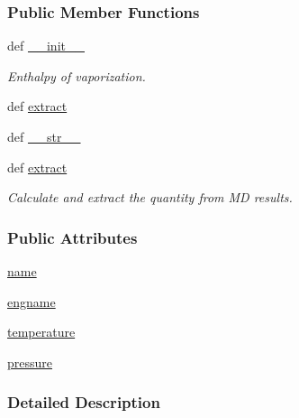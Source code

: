 \subsubsection*{Public Member Functions}
\begin{DoxyCompactItemize}
\item 
def \hyperlink{classforcebalance_1_1quantity_1_1Quantity__H__vap_ac34dd0a9254d752f9652855de93fa0e5}{\-\_\-\-\_\-init\-\_\-\-\_\-}
\begin{DoxyCompactList}\small\item\em Enthalpy of vaporization. \end{DoxyCompactList}\item 
def \hyperlink{classforcebalance_1_1quantity_1_1Quantity__H__vap_aaadaea37cf2bb0c9a31d0e48c4034efc}{extract}
\item 
def \hyperlink{classforcebalance_1_1quantity_1_1Quantity_a0b789c405027c2b184f268702d751ff5}{\-\_\-\-\_\-str\-\_\-\-\_\-}
\item 
def \hyperlink{classforcebalance_1_1quantity_1_1Quantity_af237c272a8ec761b4f9b64980eded918}{extract}
\begin{DoxyCompactList}\small\item\em Calculate and extract the quantity from M\-D results. \end{DoxyCompactList}\end{DoxyCompactItemize}
\subsubsection*{Public Attributes}
\begin{DoxyCompactItemize}
\item 
\hyperlink{classforcebalance_1_1quantity_1_1Quantity__H__vap_a086f08ed40f4c6c3967ee3e36c1100a7}{name}
\item 
\hyperlink{classforcebalance_1_1quantity_1_1Quantity__H__vap_ad024365807f1d4ece261ca6901128709}{engname}
\item 
\hyperlink{classforcebalance_1_1quantity_1_1Quantity_a30da0699f09b247b74014a9a1a6a2d09}{temperature}
\item 
\hyperlink{classforcebalance_1_1quantity_1_1Quantity_a972fbe22434f2aedca70addaed1a0bea}{pressure}
\end{DoxyCompactItemize}


\subsubsection{Detailed Description}


